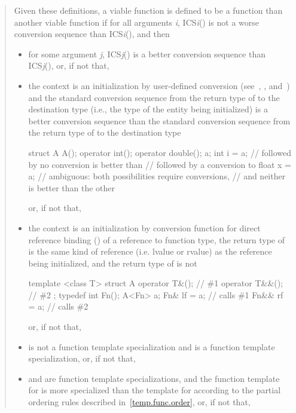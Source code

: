 \begin{quote}
Given these definitions, a viable function
is defined
to be a
function than another viable function
if
for all arguments
\textit{i},
ICS\textit{i}() is not a worse conversion
sequence than ICS\textit{i}(), and then
\begin{itemize}
\item
for some argument
\textit{j},
ICS\textit{j}() is a better conversion
sequence than ICS\textit{j}(), or, if not that,

\item
the context is an initialization by user-defined conversion
(see~,
, and~)
and the standard conversion sequence from the return type of
to the destination type (i.e., the type of the entity being initialized)
is a better conversion sequence than the standard conversion sequence
from the return type of
to the destination type
\enterexample
\begin{codeblock}
struct A {
  A();
  operator int();
  operator double();
} a;
int i = a;          //  followed by no conversion is better than
                    //  followed by a conversion to 
float x = a;        // ambiguous: both possibilities require conversions,
                    // and neither is better than the other
\end{codeblock}
\exitexample
or, if not that,

\item the context is an initialization by conversion function for direct
reference binding () of a reference to function type, the
return type of  is the same kind of reference (i.e. lvalue or rvalue)
as the reference being initialized, and the return type of  is not
\enterexample
\begin{codeblock}
template <class T> struct A {
  operator T&();    // \#1
  operator T&&();   // \#2
};
typedef int Fn();
A<Fn> a;
Fn& lf = a;         // calls \#1
Fn&& rf = a;        // calls \#2
\end{codeblock}
\exitexample
or, if not that,

\item
{}
is not a function template specialization and
is a
function template
specialization, or, if not that,

\item
{} and  are function template specializations,
and the function template
for  is more specialized than the template for 
according to the partial ordering rules described in~\ref{temp.func.order},
or, if not that,


\end{itemize}
\end{quote}
